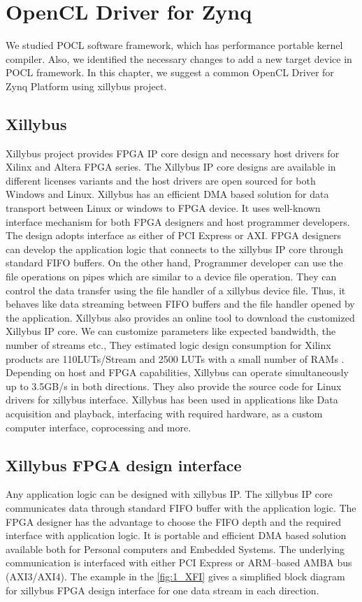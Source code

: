 \chapter{OpenCL Driver for Zynq}
\label{ch4_OpenCL_Driver_for_Zynq}

We studied POCL software framework, which has performance portable kernel compiler. Also, we identified the necessary changes to add a new target device in POCL framework. In this chapter, we suggest a common OpenCL Driver for Zynq Platform using xillybus project. 

\section{Xillybus}
Xillybus project provides FPGA IP core design and necessary host drivers for Xilinx and Altera FPGA series. The Xillybus IP core designs are available in different licenses variants and the host drivers are open sourced for both Windows and Linux. Xillybus has an efficient DMA based solution for data transport between Linux or windows to FPGA device. It uses well-known interface mechanism for both FPGA designers and host programmer developers. The design adopts interface as either of PCI Express or AXI. FPGA designers can develop the application logic that connects to the xillybus IP core through standard FIFO buffers. On the other hand, Programmer developer can use the file operations on pipes which are similar to a device file operation. They can control the data transfer using the file handler of a xillybus device file. Thus, it behaves like data streaming between FIFO buffers and the file handler opened by the application. Xillybus also provides an online tool to download the customized Xillybus IP core. We can customize parameters like expected bandwidth, the number of streams etc., They estimated logic design consumption for Xilinx products are 110LUTs/Stream and 2500 LUTs with a small number of RAMs  \cite{21}. Depending on host and FPGA capabilities, Xillybus can operate simultaneously up to 3.5GB/s in both directions. They also provide the source code for Linux drivers for xillybus interface. Xillybus has been used in applications like Data acquisition and playback, interfacing with required hardware, as a custom computer interface, coprocessing and more.

\section{Xillybus FPGA design interface}
Any application logic can be designed with xillybus IP. The xillybus IP core communicates data through standard FIFO buffer with the application logic. The FPGA designer has the advantage to choose the FIFO depth and the required interface with application logic. It is portable and efficient DMA based solution available both for Personal computers and Embedded Systems. The underlying communication is interfaced with either PCI Express or ARM--based AMBA bus (AXI3/AXI4). The example in the \ref{fig:1_XFI} \cite{22} gives a simplified block diagram for xillybus FPGA design interface for one data stream in each direction.


